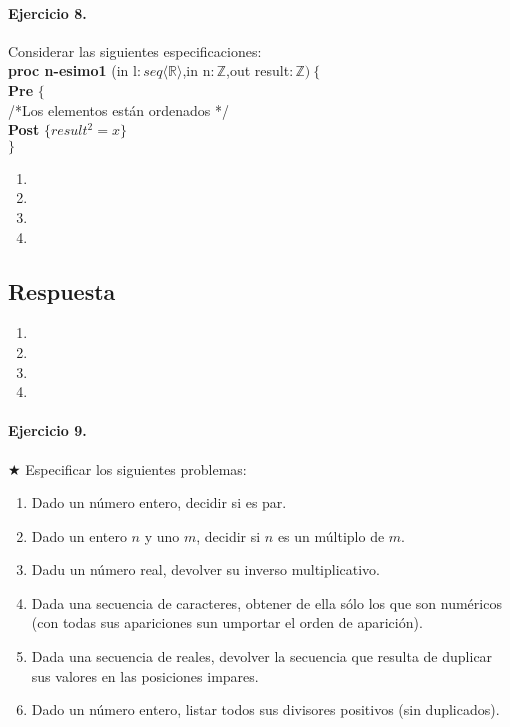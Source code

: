 \documentclass[a4paper]{article}
\begin{document}
\paragraph*{Ejercicio 8.} Considerar las siguientes especificaciones:\medskip \\
\textbf{proc n-esimo1 }(in l$: seq\langle \mathbb{R}\rangle$,in n$: \mathbb{Z}$,out result$:\mathbb{Z})\ \{$\smallskip \\
		\hspace*{6mm} \textbf{Pre }$\{$\\
		\hspace*{6mm} /*Los elementos están ordenados */\\
		\hspace*{6mm} \textbf{Post }$\{result^2=x\}$\\
		$\}$
	\begin{enumerate}[label=\alph*)]
		\item
		\item
		\item
		\item
	\end{enumerate}
\subsection*{Respuesta}
	\begin{enumerate}[label=\alph*)]
		\item
		\item
		\item
		\item
	\end{enumerate}
	
\paragraph*{Ejercicio 9.}$\bigstar$ Especificar los siguientes problemas:
	\begin{enumerate}[label=\alph*)]
		\item Dado un número entero, decidir si es par.
		\item Dado un entero $n$ y uno $m$, decidir si $n$ es un múltiplo de $m$.
		\item Dadu un número real, devolver su inverso multiplicativo.
		\item Dada una secuencia de caracteres, obtener de ella sólo los que son numéricos (con todas sus apariciones sun umportar el orden de aparición).
		\item Dada una secuencia de reales, devolver la secuencia que resulta de duplicar sus valores en las posiciones impares.
		\item Dado un número entero, listar todos sus divisores positivos (sin duplicados).
	\end{enumerate}
\end{document}
